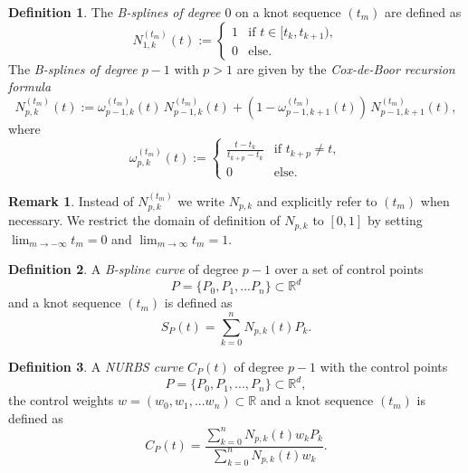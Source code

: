 \documentclass[a4paper, 11pt]{report}
\theoremstyle{definition}
\newtheorem{definition}{Definition}[section]
\newtheorem*{remark}{Remark}
\renewcommand{\emph}[1]{\textit{#1}}
\begin{document}
	\begin{definition}
		The \emph{B-splines of degree $0$} on a knot sequence $(t_m)$ are defined as
		\begin{equation}
			N^{(t_m)}_{1,k}(t) :=
			\begin{cases}
				1 & \text{if } t \in [t_k, t_{k+1}),\\
				0 & \text{else.}
			\end{cases}
		\end{equation}
		The \emph{B-splines of degree $p-1$} with $p > 1$ are given by the \emph{Cox-de-Boor recursion formula}
		\begin{equation}\label{eq:coxdeboorrec}
			N_{p,k}^{(t_m)}(t) := \omega^{(t_m)}_{p-1, k}(t) \, N^{(t_m)}_{p-1, k}(t) + (1-\omega^{(t_m)}_{p-1, k+1}(t)) \, N^{(t_m)}_{p-1, k+1}(t),
		\end{equation}
		where
		\begin{equation}
			\omega^{(t_m)}_{p,k}(t) := 
			\begin{cases}
				\frac{t-t_k}{t_{k+p} - t_k} &\text{if } t_{k+p} \neq t,\\
				0 							&\text{else.}
			\end{cases}
		\end{equation}
	\end{definition}

	\begin{remark}
		Instead of $N_{p,k}^{(t_m)}$ we write $N_{p,k}$ and explicitly refer to $(t_m)$ when necessary. We restrict the domain of definition of $N_{p,k}$ to $[0, 1]$ by setting $\lim_{m \to -\infty} t_m = 0$ and $\lim_{m \to \infty} t_m = 1$.
	\end{remark}

	\begin{definition}
		A \emph{B-spline curve} of degree $p-1$ over a set of control points
			$$P = \{P_0, P_1, ... P_n\} \subset \mathbb{R}^d$$
		and a knot sequence $(t_m)$ is defined as
			$$ S_P(t) = \sum_{k=0}^{n} N_{p,k}(t) P_k.$$
	\end{definition}

	\begin{definition}\label{def:nurbs}
		A \emph{NURBS curve} $C_P(t)$ of degree $p-1$ with the control points 
			$$P = \{P_0, P_1, ..., P_n\} \subset \mathbb{R}^d,$$ 
		the control weights $w = (w_0, w_1, ... w_n) \subset \mathbb{R}$ and a knot sequence $(t_m)$ is defined as
		\begin{equation}
			C_P(t) = \frac{\sum_{k=0}^n N_{p,k}(t) w_k P_k}{\sum_{k=0}^n N_{p,k}(t) w_k}.
		\end{equation}
	\end{definition}
\end{document}
